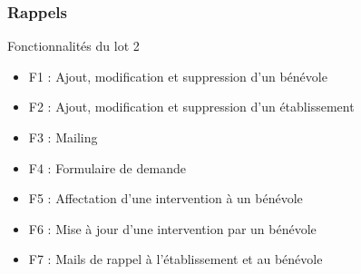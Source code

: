 \speaker{\Francois}

\begin{frame}
\frametitle{Rappels}
\begin{block}{Fonctionnalités du lot 2}
	\begin{itemize}
		\item F1 : Ajout, modification et suppression d'un bénévole
		\item F2 : Ajout, modification et suppression d'un établissement
		\item F3 : Mailing
		\item F4 : Formulaire de demande
		\item F5 : Affectation d'une intervention à un bénévole
		\item F6 : Mise à jour d'une intervention par un bénévole
		\item F7 : Mails de rappel à l'établissement et au bénévole
	\end{itemize}
\end{block}
\end{frame}
